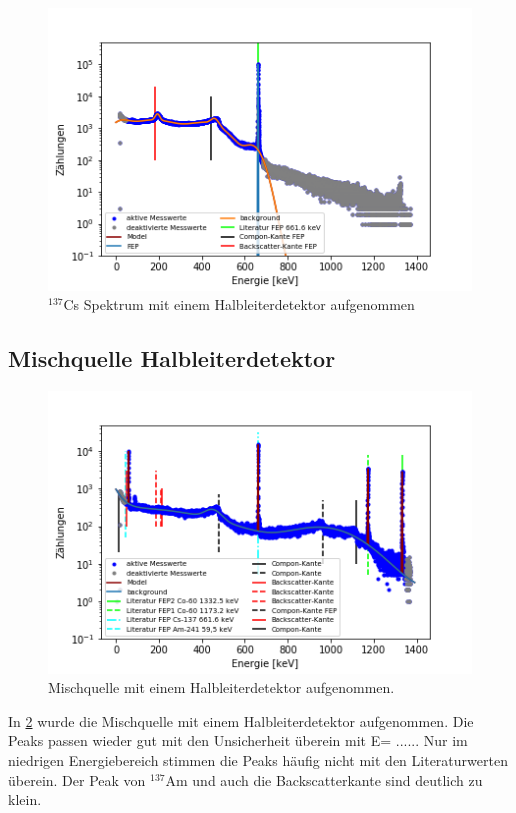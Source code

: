 \begin{figure}[ht]
	\centering
	\includegraphics[scale=0.8]{cs_pn_.png}
	\caption{$^{137}$Cs Spektrum mit einem Halbleiterdetektor aufgenommen}
	\label{cs_pn}
\end{figure}

\newpage
\subsection{Mischquelle Halbleiterdetektor}
\begin{figure}[ht]
	\centering
	\includegraphics[scale=0.8]{../Messwerte/Mischquelle_pn_.png}
	\caption{Mischquelle mit einem Halbleiterdetektor aufgenommen.}
	\label{Mischquelle_pn}
\end{figure}

In \cref{Mischquelle_pn} wurde die Mischquelle mit einem Halbleiterdetektor aufgenommen. Die Peaks passen wieder gut mit den Unsicherheit überein mit E= ......
Nur im niedrigen Energiebereich stimmen die Peaks häufig nicht mit den Literaturwerten überein. Der Peak von $^{137}$Am und auch die Backscatterkante sind deutlich zu klein.


